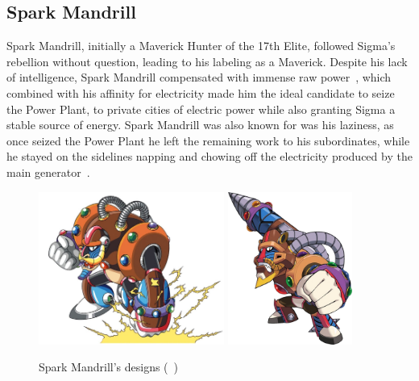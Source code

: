 \subsection{Spark Mandrill}\label{boss:Spark_mandrill}
Spark Mandrill, initially a Maverick Hunter of the 17th Elite, followed Sigma's rebellion without question, leading to his labeling as a Maverick.
 Despite his lack of intelligence, Spark Mandrill compensated with immense raw power~\cite{MHX:manual}, which combined with his affinity for electricity made him the ideal candidate to seize the Power Plant, to private cities of electric power while also granting Sigma a stable source of energy. Spark Mandrill was also known for was his laziness, as once seized the Power Plant he left the remaining work to his subordinates, while he stayed on the sidelines napping and chowing off the electricity produced by the main generator~\cite{wayback:X_resources}.
 \begin{figure}[htp]
 	\centering
 	\includegraphics[height=5cm]{figures/X1/Spark_mandrill/SparkMandrill.jpg}
 	\includegraphics[height=5cm]{figures/X1/Spark_mandrill/MHXSparkMandrill.png}
 	\caption{Spark Mandrill's designs (~\cite{book:MMX_Complete_art})}
 \end{figure}
